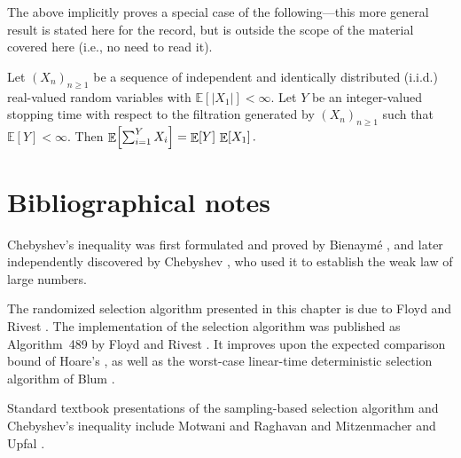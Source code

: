 The above implicitly proves a special case of the following---this more
general result is stated here for the record, but is outside the scope of
the material covered here (i.e., no need to read it).

\begin{theorem}
    Let $(X_n)_{n \ge 1}$ be a sequence of independent and identically
    distributed (i.i.d.) real-valued random variables with
    $\mathbb{E}[|X_1|] < \infty$. Let $Y$ be an integer-valued stopping time
    with respect to the filtration generated by $(X_n)_{n \ge 1}$ such that
    $\mathbb{E}[Y] < \infty$.  Then
    \begin{math}
        \mathop{\mathbb{E}}\!\left[ { \sum_{i=1}^{Y} X_i } \right] = \mathop{\mathbb{E}}\!\left[ {Y} \right] \,
        \mathop{\mathbb{E}}\!\left[ {X_1} \right].
    \end{math}
\end{theorem}




\section{Bibliographical notes}

Chebyshev's inequality was first formulated and proved by Bienaym{\'e}
\cite{b-cadld-1853}, and later independently discovered by Chebyshev
\cite{c-dvm-1867}, who used it to establish the weak law of large
numbers.

The randomized selection algorithm presented in this chapter is due to
Floyd and Rivest \cite{fr-etbs-75}. The implementation of the selection
algorithm was published as Algorithm~489 by Floyd and Rivest
\cite{fr-a4s-75}. It improves upon the expected comparison bound of
Hoare's \QuickSelect \cite{h-a6f-61}, as well as the worst-case
linear-time deterministic selection algorithm of Blum \etal
\cite{bfprt-tbs-73}.

Standard textbook presentations of the sampling-based selection algorithm
and Chebyshev's inequality include Motwani and Raghavan \cite{mr-ra-95}
and Mitzenmacher and Upfal \cite{mu-pcrpt-17}.




\ChapterEnd{}






